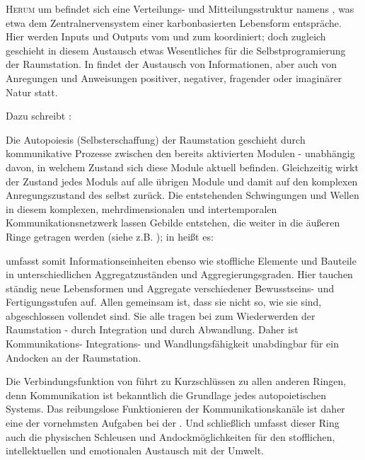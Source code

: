 \begin{newstuff}
    \lettrine{H}{erum} um  befindet sich eine Verteilungs- und Mitteilungsstruktur namens , was etwa dem Zentralnervensystem einer karbonbasierten Lebensform entspräche. Hier werden Inputs und Outputs vom und zum  koordiniert; doch zugleich geschieht in diesem Austausch etwas Wesentliches für die Selbstprogramierung der Raumstation. In  findet der Austausch von Informationen, aber auch von Anregungen und Anweisungen positiver, negativer, fragender oder imaginärer Natur statt. 

    Dazu schreibt \cite[S. 39]{cbasebook}:

    Die Autopoiesis (Selbsterschaffung) der Raumstation geschieht durch kommunikative Prozesse zwischen den bereits aktivierten Modulen - unabhängig davon, in welchem Zustand sich diese Module aktuell befinden. Gleichzeitig wirkt der Zustand jedes Moduls auf alle übrigen Module und damit auf den komplexen Anregungszustand des  selbst zurück. Die entstehenden Schwingungen und Wellen in diesem komplexen, mehrdimensionalen und intertemporalen Kommunikationsnetzwerk lassen Gebilde entstehen, die weiter in die äußeren Ringe getragen werden (siehe z.B. ); in \cite[S. 39]{cbasebook} heißt es:

     umfasst somit Informationseinheiten ebenso wie stoffliche Elemente und Bauteile in unterschiedlichen Aggregatzuständen und Aggregierungsgraden. Hier tauchen ständig neue Lebensformen und Aggregate verschiedener Be\-wusst\-seins- und Fertigungsstufen auf. Allen gemeinsam ist, dass sie nicht so, wie sie sind, abgeschlossen vollendet sind. Sie alle tragen bei zum Wiederwerden der Raumstation - durch Integration und durch Abwandlung. Daher ist Kom\-mu\-ni\-ka\-ti\-ons- Integrations- und Wandlungsfähigkeit unabdingbar für ein Andocken an der Raumstation. %

    Die Verbindungsfunktion von  führt zu Kurzschlüssen zu allen anderen Ringen, denn Kommunikation ist bekanntlich die Grundlage jedes autopoietischen Systems. Das reibungslose Funktionieren der Kommunikationskanäle ist daher eine der vornehmsten Aufgaben bei der . Und schließlich umfasst dieser Ring auch die physischen Schleusen und Andockmöglichkeiten für den stofflichen, intellektuellen und emotionalen Austausch mit der Umwelt.
\end{newstuff}